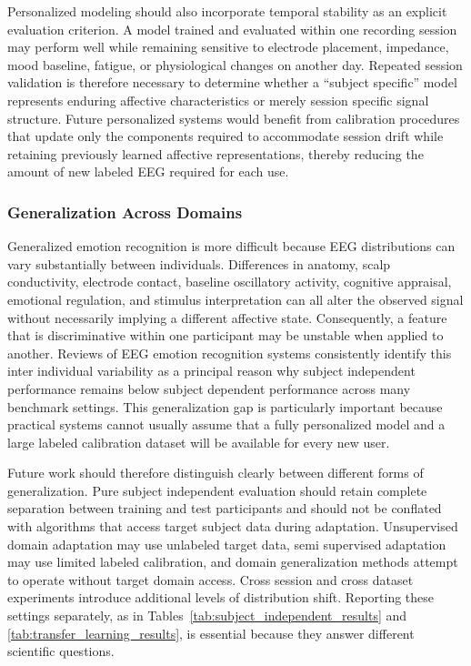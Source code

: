 \documentclass[ASNA,twocolumn]{USG}
\begin{document}
Personalized modeling should also incorporate temporal stability as an explicit evaluation criterion. A model trained and evaluated within one recording session may perform well while remaining sensitive to electrode placement, impedance, mood baseline, fatigue, or physiological changes on another day. Repeated session validation is therefore necessary to determine whether a ``subject specific'' model represents enduring affective characteristics or merely session specific signal structure. Future personalized systems would benefit from calibration procedures that update only the components required to accommodate session drift while retaining previously learned affective representations, thereby reducing the amount of new labeled EEG required for each use.

\subsubsection{Generalization Across Domains}
\label{subsubsec:generalized_modeling_challenges}

Generalized emotion recognition is more difficult because EEG distributions can vary substantially between individuals. Differences in anatomy, scalp conductivity, electrode contact, baseline oscillatory activity, cognitive appraisal, emotional regulation, and stimulus interpretation can all alter the observed signal without necessarily implying a different affective state. Consequently, a feature that is discriminative within one participant may be unstable when applied to another. Reviews of EEG emotion recognition systems consistently identify this inter individual variability as a principal reason why subject independent performance remains below subject dependent performance across many benchmark settings. This generalization gap is particularly important because practical systems cannot usually assume that a fully personalized model and a large labeled calibration dataset will be available for every new user.

Future work should therefore distinguish clearly between different forms of generalization. Pure subject independent evaluation should retain complete separation between training and test participants and should not be conflated with algorithms that access target subject data during adaptation. Unsupervised domain adaptation may use unlabeled target data, semi supervised adaptation may use limited labeled calibration, and domain generalization methods attempt to operate without target domain access. Cross session and cross dataset experiments introduce additional levels of distribution shift. Reporting these settings separately, as in Tables~\ref{tab:subject_independent_results} and \ref{tab:transfer_learning_results}, is essential because they answer different scientific questions.
\end{document}
